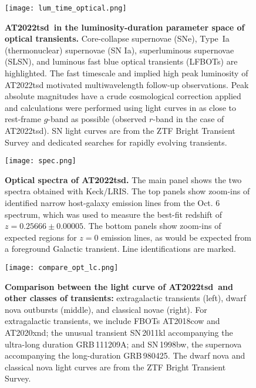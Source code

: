 \documentclass{nature_plusfigure}
\newcommand{\at}{AT2022tsd}
\begin{document}
\begin{extended_data}

\renewcommand{\thefigure}{\arabic{figure}~Extended~Data}
\renewcommand{\thefigure}{Extended Data Figure \arabic{figure}}
\renewcommand{\figurename}{}
\setcounter{figure}{0}

\renewcommand{\thetable}{\arabic{table}~Extended~Data}
\renewcommand{\thetable}{Extended Data Table \arabic{table}}
\renewcommand{\tablename}{}
\setcounter{table}{0}

\begin{figure}[ht]
\centering
\texttt{[image: lum\_time\_optical.png]}
\caption{\textbf{\at\ in the luminosity-duration parameter space of optical transients.} Core-collapse supernovae (SNe), Type~Ia (thermonuclear) supernovae (SN Ia), superluminous supernovae (SLSN), and luminous fast blue optical transients (LFBOTs\cite{Prentice2018,Perley2019,Perley2021,Ho2020_Koala,Yao2022,Coppejans2020}) are highlighted. The fast timescale and implied high peak luminosity of AT2022tsd motivated multiwavelength follow-up observations. Peak absolute magnitudes have a crude cosmological correction applied and calculations were performed using light curves in as close to rest-frame $g$-band as possible (observed $r$-band in the case of \at). SN light curves are from the ZTF Bright Transient Survey\cite{PerleyBTS,FremlingBTS} and dedicated searches for rapidly evolving transients\cite{Ho2022_RET}.}
\label{fig:opt-phase-space}
\end{figure}

\begin{figure}[ht]
 \centering
\texttt{[image: spec.png]}
  \caption{\textbf{Optical spectra of \at.} The main panel shows the two spectra obtained with Keck/LRIS. The top panels show zoom-ins of identified narrow host-galaxy emission lines from the Oct. 6 spectrum, which was used to measure the best-fit redshift of $z=0.25666\pm0.00005$. The bottom panels show zoom-ins of expected regions for $z=0$ emission lines, as would be expected from a foreground Galactic transient. Line identifications are marked.}
 \label{fig:spec}
\end{figure}

\begin{figure}[ht]
 \centering
\texttt{[image: compare\_opt\_lc.png]}
  \caption{\textbf{Comparison between the light curve of \at\ and other classes of transients:} extragalactic transients (left), dwarf nova outbursts (middle), and classical novae (right). For extragalactic transients, we include FBOTs AT2018cow\cite{Perley2019} and AT2020xnd\cite{Perley2021}; the unusual transient SN\,2011kl accompanying the ultra-long duration GRB\,111209A; and SN\,1998bw, the supernova accompanying the long-duration GRB\,980425. The dwarf nova and classical nova light curves are from the ZTF Bright Transient Survey\cite{Perley2020}.}
 \label{fig:opt-lc-comparison}
\end{figure}


\end{extended_data}
\end{document}
